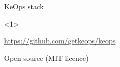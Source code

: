 \documentclass[14pt]{beamer}
\begin{document}
\begin{frame}{KeOps stack}

\begin{onlyenv}<1>
\begin{center}
\url{https://github.com/getkeops/keops}\bigskip

Open source (MIT licence)
\end{center}
\end{onlyenv}

%
\end{frame}


%
%
\end{document}
